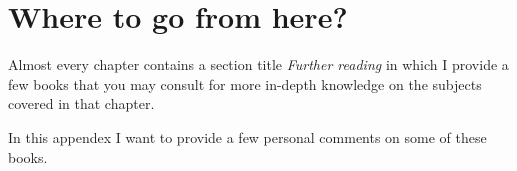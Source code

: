 \chapter{Where to go from here?}
\label{chap:go-from-here}

Almost every chapter contains a section title \emph{Further reading} in which I provide a few books that you may consult for more in-depth knowledge on the subjects covered in that chapter.

In this appendex I want to provide a few personal comments on some of these books.
